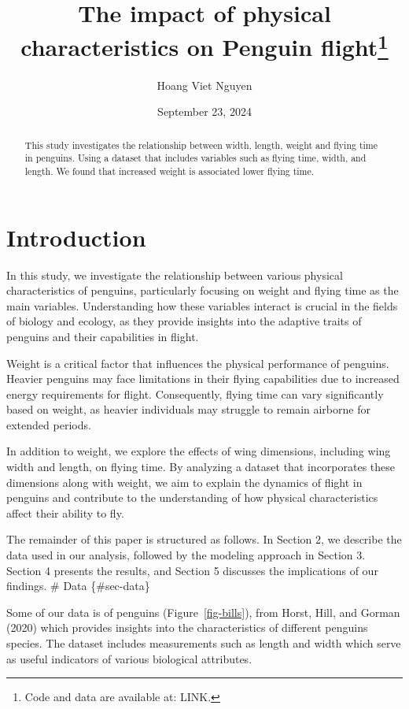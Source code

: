 \documentclass[
  letterpaper,
  DIV=11,
  numbers=noendperiod]{scrartcl}
\title{The impact of physical characteristics on Penguin
flight\thanks{Code and data are available at: LINK.}}
\author{Hoang Viet Nguyen}
\date{September 23, 2024}
\begin{document}
\maketitle
\begin{abstract}
This study investigates the relationship between width, length, weight
and flying time in penguins. Using a dataset that includes variables
such as flying time, width, and length. We found that increased weight
is associated lower flying time.
\end{abstract}


\section{Introduction}\label{introduction}

In this study, we investigate the relationship between various physical
characteristics of penguins, particularly focusing on weight and flying
time as the main variables. Understanding how these variables interact
is crucial in the fields of biology and ecology, as they provide
insights into the adaptive traits of penguins and their capabilities in
flight.

Weight is a critical factor that influences the physical performance of
penguins. Heavier penguins may face limitations in their flying
capabilities due to increased energy requirements for flight.
Consequently, flying time can vary significantly based on weight, as
heavier individuals may struggle to remain airborne for extended
periods.

In addition to weight, we explore the effects of wing dimensions,
including wing width and length, on flying time. By analyzing a dataset
that incorporates these dimensions along with weight, we aim to explain
the dynamics of flight in penguins and contribute to the understanding
of how physical characteristics affect their ability to fly.

The remainder of this paper is structured as follows. In Section 2, we
describe the data used in our analysis, followed by the modeling
approach in Section 3. Section 4 presents the results, and Section 5
discusses the implications of our findings. \# Data \{\#sec-data\}

Some of our data is of penguins (Figure~\ref{fig-bills}), from Horst,
Hill, and Gorman (2020) which provides insights into the characteristics
of different penguins species. The dataset includes measurements such as
length and width which serve as useful indicators of various biological
attributes.
\end{document}
